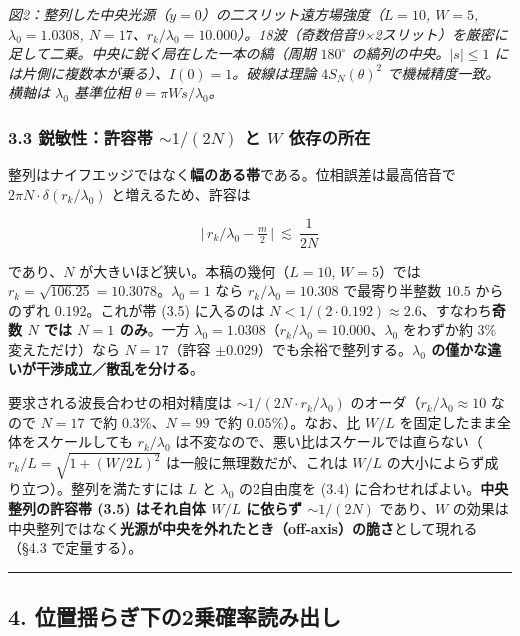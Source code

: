 \documentclass[
]{ltjsarticle}
\begin{document}
\emph{図2：整列した中央光源（\(y=0\)）の二スリット遠方場強度（\(L=10\),
\(W=5\), \(\lambda_0=1.0308\),
\(N=17\)、\(r_k/\lambda_0=10.000\)）。18波（奇数倍音9×2スリット）を厳密に足して二乗。中央に鋭く局在した一本の縞（周期
\(180^\circ\) の縞列の中央。\(|s|\le1\)
には片側に複数本が乗る）、\(I(0)=1\)。破線は理論 \(4S_N(\theta)^2\)
で機械精度一致。横軸は \(\lambda_0\) 基準位相
\(\theta=\pi W s/\lambda_0\)。}

\subsubsection{\texorpdfstring{3.3 鋭敏性：許容帯 \(\sim 1/(2N)\) と
\(W\)
依存の所在}{3.3 鋭敏性：許容帯 \textbackslash sim 1/(2N) と W 依存の所在}}\label{ux92edux654fux6027ux8a31ux5bb9ux5e2f-sim-12n-ux3068-w-ux4f9dux5b58ux306eux6240ux5728}

整列はナイフエッジではなく\textbf{幅のある帯}である。位相誤差は最高倍音で
\(2\pi N\cdot\delta(r_k/\lambda_0)\) と増えるため、許容は

\[
\big|\,r_k/\lambda_0-\tfrac{m}{2}\,\big|\ \lesssim\ \frac{1}{2N}
\tag{3.5}
\]

であり、\(N\) が大きいほど狭い。本稿の幾何（\(L=10\), \(W=5\)）では
\(r_k=\sqrt{106.25}=10.3078\)。\(\lambda_0=1\) なら
\(r_k/\lambda_0=10.308\) で最寄り半整数 \(10.5\) からのずれ
\(0.192\)。これが帯 (3.5) に入るのは
\(N<1/(2\cdot0.192)\approx2.6\)、すなわち\textbf{奇数 \(N\) では \(N=1\)
のみ}。一方
\(\lambda_0=1.0308\)（\(r_k/\lambda_0=10.000\)、\(\lambda_0\) をわずか約
\(3\%\) 変えただけ）なら \(N=17\)（許容
\(\pm0.029\)）でも余裕で整列する。\textbf{\(\lambda_0\)
の僅かな違いが干渉成立／散乱を分ける}。

要求される波長合わせの相対精度は \(\sim 1/(2N\cdot r_k/\lambda_0)\)
のオーダ（\(r_k/\lambda_0\approx10\) なので \(N=17\) で約
\(0.3\%\)、\(N=99\) で約 \(0.05\%\)）。なお、比 \(W/L\)
を固定したまま全体をスケールしても \(r_k/\lambda_0\)
は不変なので、悪い比はスケールでは直らない（\(r_k/L=\sqrt{1+(W/2L)^2}\)
は一般に無理数だが、これは \(W/L\)
の大小によらず成り立つ）。整列を満たすには \(L\) と \(\lambda_0\)
の2自由度を (3.4) に合わせればよい。\textbf{中央整列の許容帯 (3.5)
はそれ自体 \(W/L\) に依らず \(\sim1/(2N)\)} であり、\(W\)
の効果は中央整列ではなく\textbf{光源が中央を外れたとき（off-axis）の脆さ}として現れる（§4.3
で定量する）。

\begin{center}\rule{0.5\linewidth}{0.5pt}\end{center}

\subsection{4.
位置揺らぎ下の2乗確率読み出し}\label{ux4f4dux7f6eux63faux3089ux304eux4e0bux306e2ux4e57ux78baux7387ux8aadux307fux51faux3057}
\end{document}
